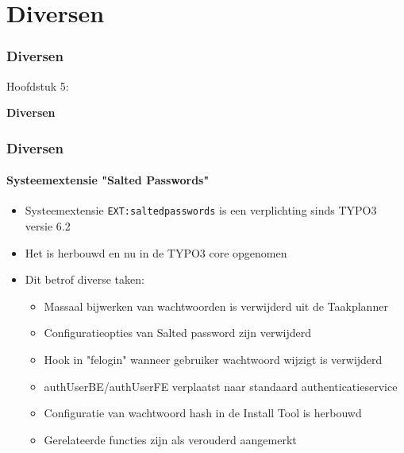 %

\section{Diversen}
\begin{frame}[fragile]
	\frametitle{Diversen}

	\begin{center}\huge{Hoofdstuk 5:}\end{center}
	\begin{center}\huge{\color{typo3darkgrey}\textbf{Diversen}}\end{center}

\end{frame}

%

\begin{frame}[fragile]
	\frametitle{Diversen}
	\framesubtitle{Systeemextensie "Salted Passwords"}

	\begin{itemize}
        \item Systeemextensie \texttt{EXT:saltedpasswords} is een verplichting
        	sinds TYPO3 versie 6.2
		\item Het is herbouwd en nu in de TYPO3 core opgenomen

		\item Dit betrof diverse taken:

			\begin{itemize}
		        \item Massaal bijwerken van wachtwoorden is verwijderd uit de Taakplanner
				\item Configuratieopties van Salted password zijn verwijderd
				\item Hook in "felogin" wanneer gebruiker wachtwoord wijzigt is verwijderd
				\item authUserBE/authUserFE verplaatst naar standaard authenticatieservice
				\item Configuratie van wachtwoord hash in de Install Tool is herbouwd
				\item Gerelateerde functies zijn als verouderd aangemerkt
			\end{itemize}

	\end{itemize}

\end{frame}

